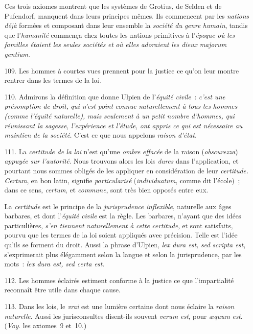\documentclass[french,twoside]{book} %
\begin{document}
Ces trois axiomes montrent que les systèmes de Grotius, de Selden et de Pufendorf, manquent dans leurs principes mêmes. Ils commencent par les {\itshape nations déjà} formées et composant dans leur ensemble la {\itshape société du genre humain}, tandis que l’{\itshape humanité} commença chez toutes les nations primitives à l’{\itshape époque où les familles étaient les seules sociétés et où elles adoraient les dieux majorum gentium}.\par
109. Les hommes à courtes vues prennent pour la justice ce qu’on leur montre rentrer dans les termes de la loi.\par
110. Admirons la définition que donne Ulpien de l’{\itshape équité civile} : \emph{{\itshape c’est une présomption de droit, qui n’est point connue naturellement à tous les hommes} (comme l’équité naturelle){\itshape , mais seulement à un petit nombre d’hommes, qui réunissant la sagesse, l’expérience et l’étude, ont appris ce qui est nécessaire au maintien de la société}}. C’est ce que nous appelons {\itshape raison d’état}.\par
111. La {\itshape certitude de la loi} n’est qu’une {\itshape ombre effacée} de la raison ({\itshape obscurezza}) {\itshape appuyée sur l’autorité}. Nous trouvons alors les lois {\itshape dures} dans l’application, et pourtant nous sommes obligés de les appliquer en considération de leur {\itshape certitude. Certum}, en bon latin, signifie {\itshape particularisé} ({\itshape individuatum},  comme dit l’école) ; dans ce sens, {\itshape certum}, et {\itshape commune}, sont très bien opposés entre eux.\par
La {\itshape certitude} est le principe de la {\itshape jurisprudence inflexible}, naturelle aux âges barbares, et dont l’{\itshape équité civile} est la règle. Les barbares, n’ayant que des idées particulières, {\itshape s’en tiennent naturellement à cette certitude}, et sont satisfaits, pourvu que les termes de la loi soient appliqués avec précision. Telle est l’idée qu’ils se forment du droit. Aussi la phrase d’Ulpien, \emph{{\itshape lex dura est, sed scripta est}}, s’exprimerait plus élégamment selon la langue et selon la jurisprudence, par les mots : {\itshape lex dura est, sed certa est}.\par
112. Les hommes éclairés estiment conforme à la justice ce que l’impartialité reconnaît être utile dans chaque cause.\par
113. Dans les lois, le {\itshape vrai} est une lumière certaine dont nous éclaire la {\itshape raison naturelle}. Aussi les jurisconsultes disent-ils souvent {\itshape verum est}, pour {\itshape æquum est}. ({\itshape Voy.} les axiomes 9 et 10.)\par
\end{document}
